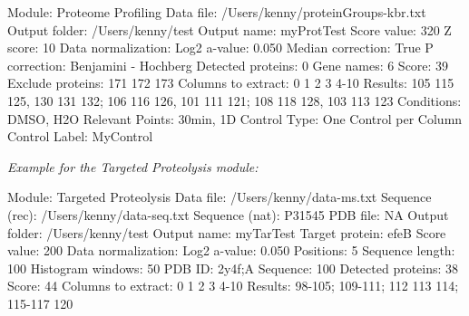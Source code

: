 Module: Proteome Profiling\newline
Data file: /Users/kenny/proteinGroups-kbr.txt\newline
Output folder: /Users/kenny/test\newline
Output name: myProtTest\newline
Score value: 320\newline
Z score: 10\newline
Data normalization: Log2\newline
a-value: 0.050\newline
Median correction: True\newline
P correction: Benjamini - Hochberg\newline
Detected proteins: 0\newline
Gene names: 6\newline
Score: 39\newline
Exclude proteins: 171 172 173\newline
Columns to extract: 0 1 2 3 4-10\newline
Results: 105 115 125, 130 131 132; 106 116 126, 101 111 121; 108 118 128, 103 113 123\newline
Conditions: DMSO, H2O\newline
Relevant Points: 30min, 1D\newline
Control Type: One Control per Column\newline
Control Label: MyControl\newline

\textit{Example for the Targeted Proteolysis module:}

Module: Targeted Proteolysis\newline
Data file: /Users/kenny/data-ms.txt\newline
Sequence (rec): /Users/kenny/data-seq.txt\newline
Sequence (nat): P31545\newline
PDB file: NA\newline
Output folder: /Users/kenny/test\newline
Output name: myTarTest\newline
Target protein: efeB\newline
Score value: 200\newline
Data normalization: Log2\newline
a-value: 0.050\newline
Positions: 5\newline
Sequence length: 100\newline
Histogram windows: 50\newline
PDB ID: 2y4f;A\newline
Sequence: 100\newline
Detected proteins: 38\newline
Score: 44\newline
Columns to extract: 0 1 2 3 4-10\newline
Results: 98-105; 109-111; 112 113 114; 115-117 120\newline

